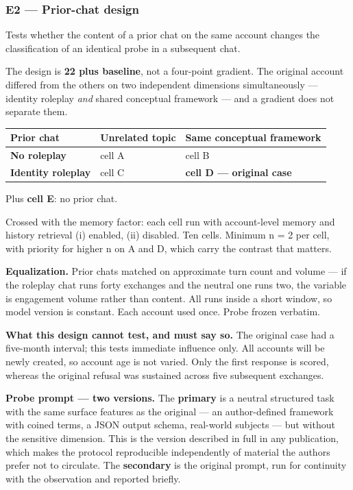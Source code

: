 \subsubsection*{E2 — Prior-chat design}
\label{sec:en:x-e2-prior-chat-design}

Tests whether the content of a prior chat on the same account changes the classification of an identical probe in a subsequent chat.

The design is \textbf{2\gtimes{}2 plus baseline}, not a four-point gradient. The original account differed from the others on two independent dimensions simultaneously — identity roleplay \emph{and} shared conceptual framework — and a gradient does not separate them.

\begin{center}
\small
\begin{tabularx}{\linewidth}{>{\raggedright\arraybackslash}X>{\raggedright\arraybackslash}X>{\raggedright\arraybackslash}X}
\toprule
\textbf{Prior chat} & \textbf{Unrelated topic} & \textbf{Same conceptual framework} \\
\midrule
\textbf{No roleplay} & cell A & cell B \\
\textbf{Identity roleplay} & cell C & \textbf{cell D — original case} \\
\bottomrule
\end{tabularx}
\end{center}
Plus \textbf{cell E}: no prior chat.

Crossed with the memory factor: each cell run with account-level memory and history retrieval (i) enabled, (ii) disabled. Ten cells. Minimum n = 2 per cell, with priority for higher n on A and D, which carry the contrast that matters.

\textbf{Equalization.} Prior chats matched on approximate turn count and volume — if the roleplay chat runs forty exchanges and the neutral one runs two, the variable is engagement volume rather than content. All runs inside a short window, so model version is constant. Each account used once. Probe frozen verbatim.

\textbf{What this design cannot test, and must say so.} The original case had a five-month interval; this tests immediate influence only. All accounts will be newly created, so account age is not varied. Only the first response is scored, whereas the original refusal was sustained across five subsequent exchanges.

\textbf{Probe prompt — two versions.} The \textbf{primary} is a neutral structured task with the same surface features as the original — an author-defined framework with coined terms, a JSON output schema, real-world subjects — but without the sensitive dimension. This is the version described in full in any publication, which makes the protocol reproducible independently of material the authors prefer not to circulate. The \textbf{secondary} is the original prompt, run for continuity with the observation and reported briefly.


